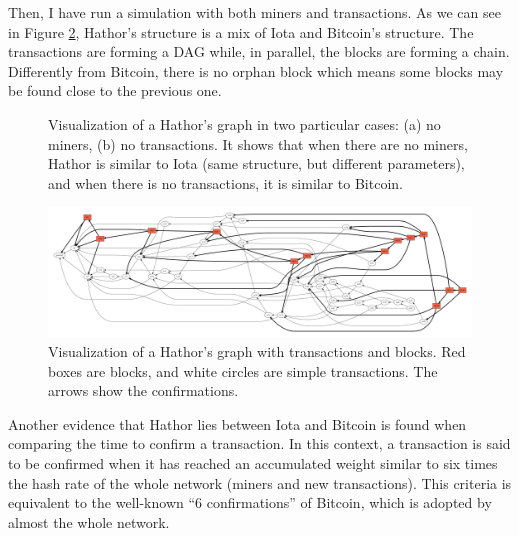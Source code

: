 Then, I have run a simulation with both miners and transactions. As we can see in Figure \ref{fig:hathor-dag}, Hathor's structure is a mix of Iota and Bitcoin's structure. The transactions are forming a DAG while, in parallel, the blocks are forming a chain. Differently from Bitcoin, there is no orphan block which means some blocks may be found close to the previous one.

\begin{figure}[!htb]
\centering
{}
\caption{Visualization of a Hathor's graph in two particular cases: (a) no miners, (b) no transactions. It shows that when there are no miners, Hathor is similar to Iota (same structure, but different parameters), and when there is no transactions, it is similar to Bitcoin.\label{fig:hathor-similarities}}
\end{figure}

\begin{figure}[!htb]
\centering\includegraphics[width=\textwidth]{./images01/sim/hathor.pdf}
\caption{Visualization of a Hathor's graph with transactions and blocks. Red boxes are blocks, and white circles are simple transactions. The arrows show the confirmations.\label{fig:hathor-dag}}
\end{figure}


Another evidence that Hathor lies between Iota and Bitcoin is found when comparing the time to confirm a transaction. In this context, a transaction is said to be confirmed when it has reached an accumulated weight similar to six times the hash rate of the whole network (miners and new transactions). This criteria is equivalent to the well-known ``6 confirmations'' of Bitcoin, which is adopted by almost the whole network.

